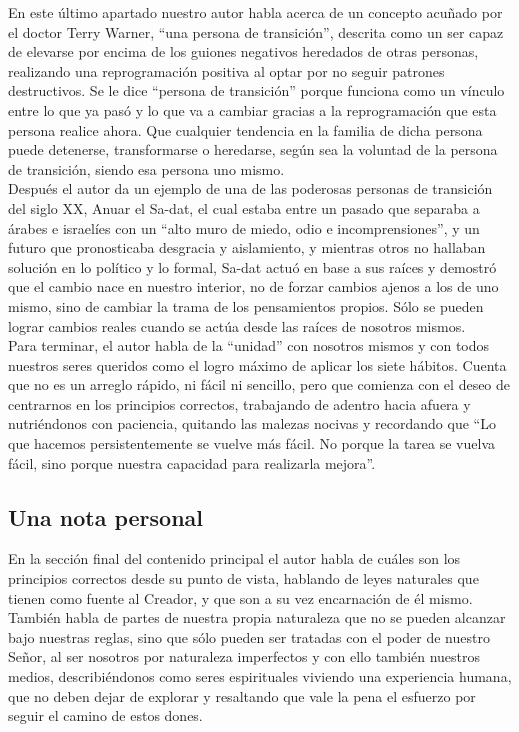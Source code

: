 \documentclass[onecolumn]{article} %
\begin{document}
	En este último apartado nuestro autor habla acerca de un concepto acuñado por el doctor Terry Warner, ``una persona de transición'', descrita como un ser capaz de elevarse por encima de los guiones negativos heredados de otras personas, realizando una reprogramación positiva al optar por no seguir patrones destructivos. Se le dice ``persona de transición'' porque funciona como un vínculo entre lo que ya pasó y lo que va a cambiar gracias a la reprogramación que esta persona realice ahora. Que cualquier tendencia en la familia de dicha persona puede detenerse, transformarse o heredarse, según sea la voluntad de la persona de transición, siendo esa persona uno mismo.\\
	
	Después el autor da un ejemplo de una de las poderosas personas de transición del siglo XX, Anuar el Sa-dat, el cual estaba entre un pasado que separaba a árabes e israelíes con un ``alto muro de miedo, odio e incomprensiones'', y un futuro que pronosticaba desgracia y aislamiento, y mientras otros no hallaban solución en lo político y lo formal, Sa-dat actuó en base a sus raíces y demostró que el cambio nace en nuestro interior, no de forzar cambios ajenos a los de uno mismo, sino de cambiar la trama de los pensamientos propios. Sólo se pueden lograr cambios reales cuando se actúa desde las raíces de nosotros mismos.\\
	
	Para terminar, el autor habla de la ``unidad'' con nosotros mismos y con todos nuestros seres queridos como el logro máximo de aplicar los siete hábitos. Cuenta que no es un arreglo rápido, ni fácil ni sencillo, pero que comienza con el deseo de centrarnos en los principios correctos, trabajando de adentro hacia afuera y nutriéndonos con paciencia, quitando las malezas nocivas y recordando que ``Lo que hacemos persistentemente se vuelve más fácil. No porque la tarea se vuelva fácil, sino porque nuestra capacidad para realizarla mejora''.
	
	\subsection{Una nota personal}
	
	 En la sección final del contenido principal el autor habla de cuáles son los principios correctos desde su punto de vista, hablando de leyes naturales que tienen como fuente al Creador, y que son a su vez encarnación de él mismo. También habla de partes de nuestra propia naturaleza que no se pueden alcanzar bajo nuestras reglas, sino que sólo pueden ser tratadas con el poder de nuestro Señor, al ser nosotros por naturaleza imperfectos y con ello también nuestros medios, describiéndonos como seres espirituales viviendo una experiencia humana, que no deben dejar de explorar y resaltando que vale la pena el esfuerzo por seguir el camino de estos dones.
	
\end{document}
